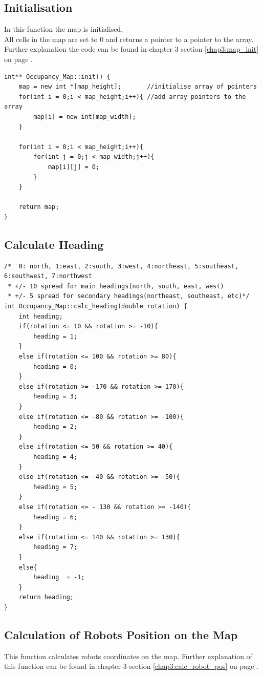 \subsection{Initialisation}
\label{code:map_init}
In this function the map is initialised.\\
All cells in the map are set to 0 and returns a pointer to a pointer to the array. 
Further explanation the code can be found in chapter 3 section \ref{chap3:map_init} on page \pageref{chap3:map_init}. 
\begin{lstlisting}[caption = {Map Initialisation}]
int** Occupancy_Map::init() {
    map = new int *[map_height];       //initialise array of pointers
    for(int i = 0;i < map_height;i++){ //add array pointers to the array
        map[i] = new int[map_width];
    }

    for(int i = 0;i < map_height;i++){
        for(int j = 0;j < map_width;j++){
            map[i][j] = 0;
        }
    }

    return map;
}
\end{lstlisting}

\subsection{Calculate Heading}
\label{code:calc_heading}

\begin{lstlisting}[caption = {Calculate the Robots Heading}]
/*  0: north, 1:east, 2:south, 3:west, 4:northeast, 5:southeast, 6:southwest, 7:northwest
 * +/- 10 spread for main headings(north, south, east, west)
 * +/- 5 spread for secondary headings(northeast, southeast, etc)*/
int Occupancy_Map::calc_heading(double rotation) {
    int heading;
    if(rotation <= 10 && rotation >= -10){
        heading = 1;
    }
    else if(rotation <= 100 && rotation >= 80){
        heading = 0;
    }
    else if(rotation >= -170 && rotation >= 170){
        heading = 3;
    }
    else if(rotation <= -80 && rotation >= -100){
        heading = 2;
    }
    else if(rotation <= 50 && rotation >= 40){
        heading = 4;
    }
    else if(rotation <= -40 && rotation >= -50){
        heading = 5;
    }
    else if(rotation <= - 130 && rotation >= -140){
        heading = 6;
    }
    else if(rotation <= 140 && rotation >= 130){
        heading = 7;
    }
    else{
        heading  = -1;
    }
    return heading;
}
\end{lstlisting}

\subsection{Calculation of Robots Position on the Map}
\label{code:calc_robot_pos}
This function calculates robots coordinates on the map. 
Further explanation of this function can be found in chapter 3 section \ref{chap3:calc_robot_pos} on page \pageref{chap3:calc_robot_pos}.

